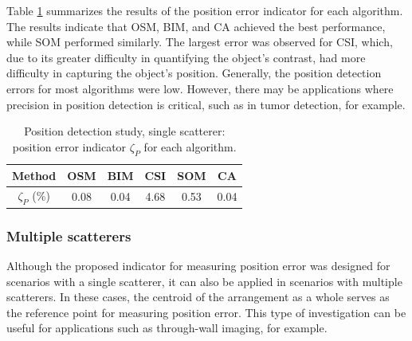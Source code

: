 \documentclass{IEEEtran}
\begin{document}
                Table \ref{tab:position:single:zeta_p} summarizes the results of the position error indicator for each algorithm. The results indicate that OSM, BIM, and CA achieved the best performance, while SOM performed similarly. The largest error was observed for CSI, which, due to its greater difficulty in quantifying the object's contrast, had more difficulty in capturing the object's position. Generally, the position detection errors for most algorithms were low. However, there may be applications where precision in position detection is critical, such as in tumor detection, for example.

                \begin{table}[!htb]
                    \centering
                    \renewcommand{\arraystretch}{1.5}
                    \caption{Position detection study, single scatterer: position error indicator $\zeta_P$ for each algorithm.}
                    \label{tab:position:single:zeta_p}
                    \begin{tabular}{cccccc}
                        Method & OSM & BIM & CSI & SOM & CA \\\hline
                        $\zeta_P$ (\%) & 0.08 & 0.04 & 4.68 & 0.53 & 0.04 \\
                    \end{tabular}   
                \end{table}
			
			\subsubsection{Multiple scatterers}\label{sec:results:position:multiple}
			

                Although the proposed indicator for measuring position error was designed for scenarios with a single scatterer, it can also be applied in scenarios with multiple scatterers. In these cases, the centroid of the arrangement as a whole serves as the reference point for measuring position error. This type of investigation can be useful for applications such as through-wall imaging, for example.
\end{document}
